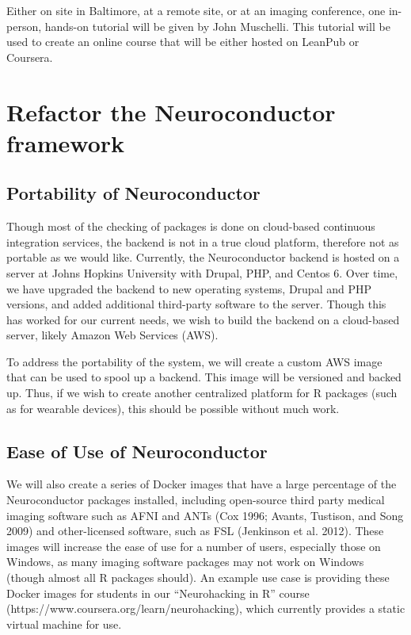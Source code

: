 \documentclass[]{elsarticle} %
\begin{document}
Either on site in Baltimore, at a remote site, or at an imaging conference, one in-person, hands-on tutorial will be given by John Muschelli. This tutorial will be used to create an online course that will be either hosted on LeanPub or Coursera.

\hypertarget{refactor-the-neuroconductor-framework}{%
\section{Refactor the Neuroconductor framework}\label{refactor-the-neuroconductor-framework}}

\hypertarget{portability-of-neuroconductor}{%
\subsection{Portability of Neuroconductor}\label{portability-of-neuroconductor}}

Though most of the checking of packages is done on cloud-based continuous integration services, the backend is not in a true cloud platform, therefore not as portable as we would like. Currently, the Neuroconductor backend is hosted on a server at Johns Hopkins University with Drupal, PHP, and Centos 6. Over time, we have upgraded the backend to new operating systems, Drupal and PHP versions, and added additional third-party software to the server. Though this has worked for our current needs, we wish to build the backend on a cloud-based server, likely Amazon Web Services (AWS).

To address the portability of the system, we will create a custom AWS image that can be used to spool up a backend. This image will be versioned and backed up. Thus, if we wish to create another centralized platform for R packages (such as for wearable devices), this should be possible without much work.

\hypertarget{ease-of-use-of-neuroconductor}{%
\subsection{Ease of Use of Neuroconductor}\label{ease-of-use-of-neuroconductor}}

We will also create a series of Docker images that have a large percentage of the Neuroconductor packages installed, including open-source third party medical imaging software such as AFNI and ANTs (Cox 1996; Avants, Tustison, and Song 2009) and other-licensed software, such as FSL (Jenkinson et al. 2012). These images will increase the ease of use for a number of users, especially those on Windows, as many imaging software packages may not work on Windows (though almost all R packages should). An example use case is providing these Docker images for students in our ``Neurohacking in R'' course (https://www.coursera.org/learn/neurohacking), which currently provides a static virtual machine for use.
\end{document}
